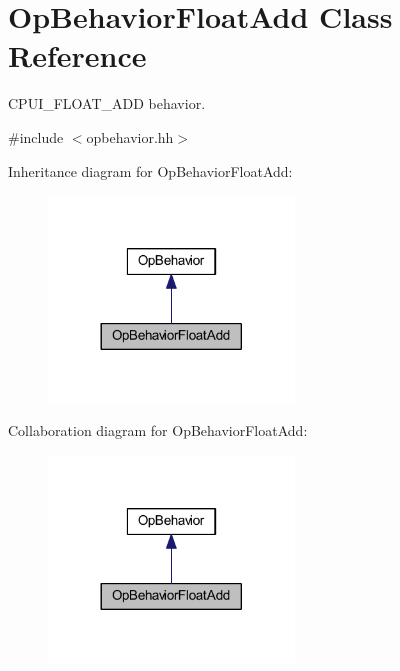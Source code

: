 \hypertarget{class_op_behavior_float_add}{}\section{Op\+Behavior\+Float\+Add Class Reference}
\label{class_op_behavior_float_add}


C\+P\+U\+I\+\_\+\+F\+L\+O\+A\+T\+\_\+\+A\+DD behavior.  




{\ttfamily \#include $<$opbehavior.\+hh$>$}



Inheritance diagram for Op\+Behavior\+Float\+Add\+:
\nopagebreak
\begin{figure}[H]
\begin{center}
\leavevmode
\includegraphics[width=185pt]{class_op_behavior_float_add__inherit__graph}
\end{center}
\end{figure}


Collaboration diagram for Op\+Behavior\+Float\+Add\+:
\nopagebreak
\begin{figure}[H]
\begin{center}
\leavevmode
\includegraphics[width=185pt]{class_op_behavior_float_add__coll__graph}
\end{center}
\end{figure}
